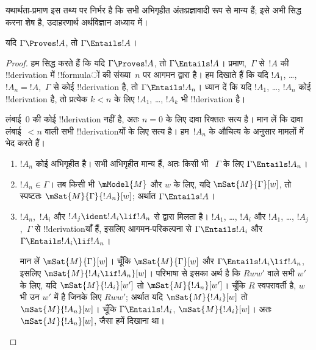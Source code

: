 \documentclass[../../../include/open-logic-section]{subfiles}
\begin{document}


\begin{editorial}
  यथार्थता-प्रमाण इस तथ्य पर निर्भर है कि सभी अभिगृहीत अंतःप्रज्ञावादी रूप
  से मान्य हैं; इसे अभी सिद्ध करना शेष है, उदाहरणार्थ अर्थविज्ञान अध्याय में।
\end{editorial}

\begin{thm}[यथार्थता]
  यदि $\Gamma \Proves !A$, तो $\Gamma \Entails !A$।
\end{thm}

\begin{proof}
  हम सिद्ध करते हैं कि यदि $\Gamma \Proves !A$, तो
  $\Gamma \Entails !A$। प्रमाण,~$\Gamma$ से~$!A$ की !!{derivation} में
  !!{formula}ों की संख्या~$n$ पर आगमन द्वारा है। हम दिखाते हैं कि यदि
  $!A_1$, \dots, $!A_n = !A$,~$\Gamma$ से कोई !!{derivation} है, तो
  $\Gamma \Entails !A_n$। ध्यान दें कि यदि $!A_1$, \dots, $!A_n$ कोई
  !!{derivation} है, तो प्रत्येक $k<n$ के लिए $!A_1$, \dots, $!A_k$ भी
  !!{derivation} है।

  लंबाई~$0$ की कोई !!{derivation} नहीं है, अतः $n=0$ के लिए दावा रिक्ततः
  सत्य है। मान लें कि दावा लंबाई~$<n$ वाली सभी !!{derivation}यों के लिए
  सत्य है। हम~$!A_n$ के औचित्य के अनुसार मामलों में भेद करते हैं।
  
  \begin{enumerate}
  \item $!A_n$ कोई अभिगृहीत है। सभी अभिगृहीत मान्य हैं, अतः किसी भी
    ~$\Gamma$ के लिए $\Gamma \Entails !A_n$।
  \item $!A_n \in \Gamma$। तब किसी भी $\mModel{M}$ और $w$ के लिए, यदि
    $\mSat{M}{\Gamma}[w]$, तो स्पष्टतः
    $\mSat{M}{\Gamma}{!A_n}[w]$; अर्थात $\Gamma \Entails !A$।
  \item $!A_n$,~$!A_i$ और $!A_j \ident !A_i \lif !A_n$ से \MP{} द्वारा
    मिलता है। $!A_1$, \dots, $!A_i$ और $!A_1$, \dots, $!A_j$,~$\Gamma$
    से !!{derivation}याँ हैं, इसलिए आगमन-परिकल्पना से
    $\Gamma \Entails !A_i$ और $\Gamma \Entails !A_i \lif !A_n$।
    
    मान लें $\mSat{M}{\Gamma}[w]$। चूँकि $\mSat{M}{\Gamma}[w]$ और
    $\Gamma \Entails !A_i \lif !A_n$, इसलिए
    $\mSat{M}{!A_i \lif !A_n}[w]$। परिभाषा से इसका अर्थ है कि $Rww'$ वाले
    सभी $w'$ के लिए, यदि $\mSat{M}{!A_i}[w']$ तो
    $\mSat{M}{!A_n}[w']$। चूँकि $R$ स्वपरावर्ती है, $w$ भी उन $w'$ में है
    जिनके लिए $Rww'$; अर्थात यदि $\mSat{M}{!A_i}[w]$ तो
    $\mSat{M}{!A_n}[w]$। चूँकि $\Gamma \Entails !A_i$,
    $\mSat{M}{!A_i}[w]$। अतः $\mSat{M}{!A_n}[w]$, जैसा हमें दिखाना था।
  \end{enumerate}
\end{proof}
\end{document}
